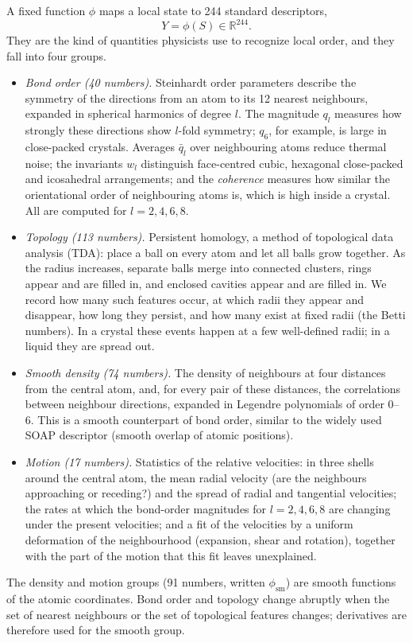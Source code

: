 \documentclass[11pt,a4paper]{article}
\numberwithin{equation}{section}
\newcommand{\R}{\mathbb R}
\newcommand{\sm}{\mathrm{sm}}
\begin{document}
A fixed function $\phi$ maps a local state to 244 standard descriptors,
\begin{equation}
Y=\phi(S)\in\R^{244}.
\end{equation}
They are the kind of quantities physicists use to recognize local order, and they
fall into four groups.
\begin{itemize}[leftmargin=1.5em]
\item \emph{Bond order (40 numbers).} Steinhardt order parameters describe the
  symmetry of the directions from an atom to its 12 nearest neighbours, expanded in
  spherical harmonics of degree $l$. The magnitude $q_l$ measures how strongly these
  directions show $l$-fold symmetry; $q_6$, for example, is large in close-packed
  crystals. Averages $\bar q_l$ over neighbouring atoms reduce thermal noise; the
  invariants $w_l$ distinguish face-centred cubic, hexagonal close-packed and
  icosahedral arrangements; and the \emph{coherence} measures how similar the
  orientational order of neighbouring atoms is, which is high inside a crystal.
  All are computed for $l=2,4,6,8$.
\item \emph{Topology (113 numbers).} Persistent homology, a method of topological
  data analysis (TDA): place a ball on every atom and let all balls grow together.
  As the radius increases, separate balls merge into connected clusters, rings
  appear and are filled in, and enclosed cavities appear and are filled in. We
  record how many such features occur, at which radii they appear and disappear,
  how long they persist, and how many exist at fixed radii (the Betti numbers). In a
  crystal these events happen at a few well-defined radii; in a liquid they are
  spread out.
\item \emph{Smooth density (74 numbers).} The density of neighbours at four distances
  from the central atom, and, for every pair of these distances, the correlations
  between neighbour directions, expanded in Legendre polynomials of order 0--6. This
  is a smooth counterpart of bond order, similar to the widely used SOAP descriptor
  (smooth overlap of atomic positions).
\item \emph{Motion (17 numbers).} Statistics of the relative velocities: in three
  shells around the central atom, the mean radial velocity (are the neighbours
  approaching or receding?) and the spread of radial and tangential velocities; the
  rates at which the bond-order magnitudes for $l=2,4,6,8$ are changing under the
  present velocities; and a fit of the velocities by a uniform deformation of the
  neighbourhood (expansion, shear and rotation), together with the part of the
  motion that this fit leaves unexplained.
\end{itemize}
The density and motion groups (91 numbers, written $\phi_\sm$) are smooth
functions of the atomic coordinates. Bond order and topology change abruptly when
the set of nearest neighbours or the set of topological features changes;
derivatives are therefore used for the smooth group.
\end{document}
